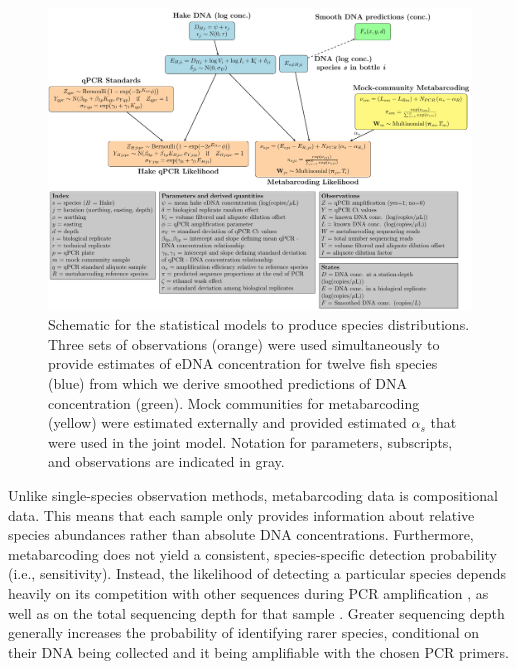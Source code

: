 \documentclass{article}
\begin{document}
\begin{figure}[tbhp] 
\centering
\includegraphics[width=16cm]{plots/DAG_v3.pdf} 
\caption{Schematic for the statistical models to produce species distributions. Three sets of observations (orange) were used simultaneously to provide estimates of eDNA concentration for twelve fish species (blue) from which we derive smoothed predictions of DNA concentration (green). Mock communities for metabarcoding (yellow) were estimated externally and provided estimated $\alpha_s$ that were used in the joint model. Notation for parameters, subscripts, and observations are indicated in gray.}
\label{fig:DAG_v3}
\end{figure}

Unlike single-species observation methods, metabarcoding data is compositional data. This means that each sample only provides information about relative species abundances rather than absolute DNA concentrations. Furthermore, metabarcoding does not yield a consistent, species-specific detection probability (i.e., sensitivity). Instead, the likelihood of detecting a particular species depends heavily on its competition with other sequences during PCR amplification \cite{shelton2023}, as well as on the total sequencing depth for that sample \cite{kelly2019}. Greater sequencing depth generally increases the probability of identifying rarer species, conditional on their DNA being collected and it being amplifiable with the chosen PCR primers.
\end{document}
